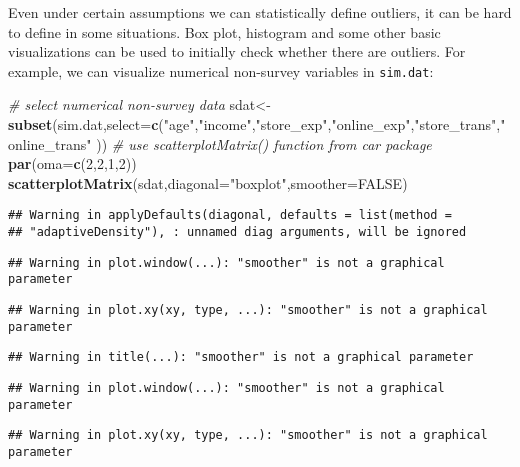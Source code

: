 \documentclass[
]{article}
\newenvironment{Shaded}{\begin{snugshade}}{\end{snugshade}}
\newcommand{\CommentTok}[1]{\textcolor[rgb]{0.56,0.35,0.01}{\textit{#1}}}
\newcommand{\DataTypeTok}[1]{\textcolor[rgb]{0.13,0.29,0.53}{#1}}
\newcommand{\DecValTok}[1]{\textcolor[rgb]{0.00,0.00,0.81}{#1}}
\newcommand{\KeywordTok}[1]{\textcolor[rgb]{0.13,0.29,0.53}{\textbf{#1}}}
\newcommand{\NormalTok}[1]{#1}
\newcommand{\OtherTok}[1]{\textcolor[rgb]{0.56,0.35,0.01}{#1}}
\newcommand{\StringTok}[1]{\textcolor[rgb]{0.31,0.60,0.02}{#1}}
\begin{document}
Even under certain assumptions we can statistically define outliers, it
can be hard to define in some situations. Box plot, histogram and some
other basic visualizations can be used to initially check whether there
are outliers. For example, we can visualize numerical non-survey
variables in \texttt{sim.dat}:

\begin{Shaded}
\begin{Highlighting}[]
\CommentTok{# select numerical non-survey data}
\NormalTok{sdat<-}\KeywordTok{subset}\NormalTok{(sim.dat,}\DataTypeTok{select=}\KeywordTok{c}\NormalTok{(}\StringTok{"age"}\NormalTok{,}\StringTok{"income"}\NormalTok{,}\StringTok{"store_exp"}\NormalTok{,}\StringTok{"online_exp"}\NormalTok{,}\StringTok{"store_trans"}\NormalTok{,}\StringTok{"online_trans"}\NormalTok{ ))}
\CommentTok{# use scatterplotMatrix() function from car package}
\KeywordTok{par}\NormalTok{(}\DataTypeTok{oma=}\KeywordTok{c}\NormalTok{(}\DecValTok{2}\NormalTok{,}\DecValTok{2}\NormalTok{,}\DecValTok{1}\NormalTok{,}\DecValTok{2}\NormalTok{))}
\KeywordTok{scatterplotMatrix}\NormalTok{(sdat,}\DataTypeTok{diagonal=}\StringTok{"boxplot"}\NormalTok{,}\DataTypeTok{smoother=}\OtherTok{FALSE}\NormalTok{)}
\end{Highlighting}
\end{Shaded}

\begin{verbatim}
## Warning in applyDefaults(diagonal, defaults = list(method =
## "adaptiveDensity"), : unnamed diag arguments, will be ignored
\end{verbatim}

\begin{verbatim}
## Warning in plot.window(...): "smoother" is not a graphical parameter
\end{verbatim}

\begin{verbatim}
## Warning in plot.xy(xy, type, ...): "smoother" is not a graphical parameter
\end{verbatim}

\begin{verbatim}
## Warning in title(...): "smoother" is not a graphical parameter
\end{verbatim}

\begin{verbatim}
## Warning in plot.window(...): "smoother" is not a graphical parameter
\end{verbatim}

\begin{verbatim}
## Warning in plot.xy(xy, type, ...): "smoother" is not a graphical parameter
\end{verbatim}
\end{document}
